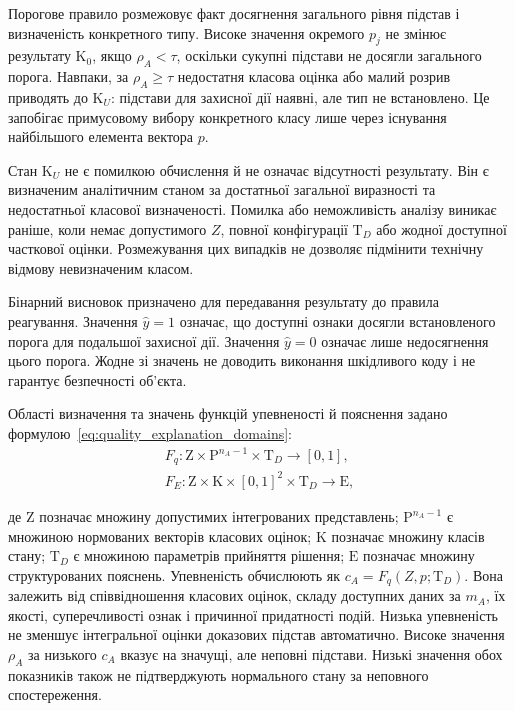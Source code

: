 Порогове правило розмежовує факт досягнення загального рівня підстав і визначеність конкретного типу. Високе значення окремого $p_j$ не змінює результату $\mathrm K_0$, якщо $\rho_A<\tau$, оскільки сукупні підстави не досягли загального порога. Навпаки, за $\rho_A\geq\tau$ недостатня класова оцінка або малий розрив приводять до $\mathrm K_U$: підстави для захисної дії наявні, але тип не встановлено. Це запобігає примусовому вибору конкретного класу лише через існування найбільшого елемента вектора $p$.

Стан $\mathrm K_U$ не є помилкою обчислення й не означає відсутності результату. Він є визначеним аналітичним станом за достатньої загальної виразності та недостатньої класової визначеності. Помилка або неможливість аналізу виникає раніше, коли немає допустимого $Z$, повної конфігурації $\mathrm T_D$ або жодної доступної часткової оцінки. Розмежування цих випадків не дозволяє підмінити технічну відмову невизначеним класом.

Бінарний висновок призначено для передавання результату до правила реагування. Значення $\hat y=1$ означає, що доступні ознаки досягли встановленого порога для подальшої захисної дії. Значення $\hat y=0$ означає лише недосягнення цього порога. Жодне зі значень не доводить виконання шкідливого коду і не гарантує безпечності об’єкта.

Області визначення та значень функцій упевненості й пояснення задано формулою~\eqref{eq:quality_explanation_domains}:
\begin{equation}
\begin{gathered}
F_q:\mathrm Z\times\mathrm P^{n_A-1}\times\mathrm T_D\rightarrow[0,1],\\
F_E:\mathrm Z\times\mathrm K\times[0,1]^2\times\mathrm T_D\rightarrow\mathrm E,
\end{gathered}
\label{eq:quality_explanation_domains}
\end{equation}

де $\mathrm Z$ позначає множину допустимих інтегрованих представлень; $\mathrm P^{n_A-1}$ є множиною нормованих векторів класових оцінок; $\mathrm K$ позначає множину класів стану; $\mathrm T_D$ є множиною параметрів прийняття рішення; $\mathrm E$ позначає множину структурованих пояснень. Упевненість обчислюють як $c_A=F_q(Z,p;\mathrm T_D)$. Вона залежить від співвідношення класових оцінок, складу доступних даних за $m_A$, їх якості, суперечливості ознак і причинної придатності подій. Низька упевненість не зменшує інтегральної оцінки доказових підстав автоматично. Високе значення $\rho_A$ за низького $c_A$ вказує на значущі, але неповні підстави. Низькі значення обох показників також не підтверджують нормального стану за неповного спостереження.

